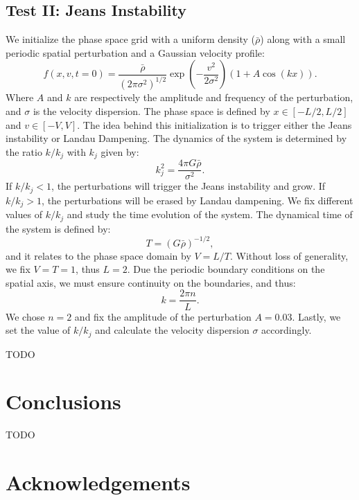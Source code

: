 \documentclass[fleqn,usenatbib]{mnras}
\begin{document}
\subsection{Test II: Jeans Instability}
We initialize the phase space grid with a uniform density ($\bar{\rho}$) along with a small periodic spatial perturbation and a Gaussian velocity profile:
\begin{equation}
f(x,v,t = 0) = \frac{\bar{\rho}}{(2\pi \sigma^2)^{1/2}} \exp(-\frac{v^2}{2 \sigma^2}) (1 + A\cos(kx)).
\end{equation} 
Where $A$ and $k$ are respectively the amplitude and frequency of the perturbation, and $\sigma$ is the velocity dispersion.
The phase space is defined by $x \in [-L/2,L/2]$ and $v \in [-V,V]$. The idea behind this initialization is to trigger either the Jeans instability or Landau Dampening. The dynamics of the system is determined by the ratio $k/k_j$ with $k_j$ given by:
\begin{equation}
\label{eq: k_j}
k_j^2 = \frac{4 \pi G \bar{\rho}}{\sigma^2}.
\end{equation}
If $k/k_j < 1$, the perturbations will trigger the Jeans instability and grow. If $k/k_j>1$, the perturbations will be erased by Landau dampening. We fix different values of $k/k_j$ and study the time evolution of the system. The dynamical time of the system is defined by:
\begin{equation}
T = (G \bar{\rho})^{-1/2},
\end{equation}
and it relates to the phase space domain by $V = L / T$. Without loss of generality, we fix $V = T = 1$, thus $L = 2$.
Due the periodic boundary conditions on the spatial axis, we must ensure continuity on the boundaries, and thus:
\begin{equation}
k = \frac{2 \pi n}{L}.
\end{equation}
We chose $n=2$ and fix the amplitude of the perturbation $A= 0.03$. Lastly, we set the value of $k/k_j$ and calculate the velocity dispersion $\sigma$ accordingly. 

TODO
\section{Conclusions}

TODO

\section*{Acknowledgements}
\end{document}
